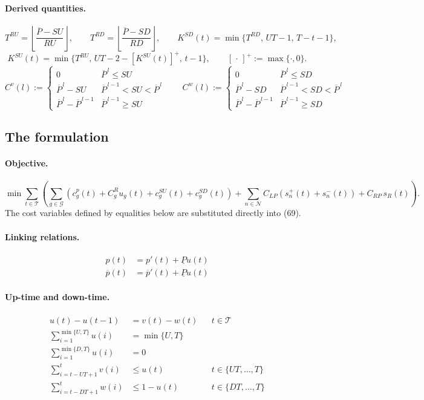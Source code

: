 \documentclass[11pt]{article}
\newcommand{\Pmax}{\overline{P}}
\newcommand{\Pmin}{\underline{P}}
\newcommand{\pbar}{\overline{p}}
\begin{document}
\paragraph{Derived quantities.}
\[
T^{RU} = \left\lfloor \frac{\Pmax - SU}{RU} \right\rfloor, \qquad
T^{RD} = \left\lfloor \frac{\Pmax - SD}{RD} \right\rfloor, \qquad
K^{SD}(t) = \min\{T^{RD},\, UT-1,\, T-t-1\},
\]
\[
K^{SU}(t) = \min\{T^{RU},\, UT-2-[K^{SU}(t)]^+,\, t-1\}, \qquad [\,\cdot\,]^+ := \max\{\cdot,0\}.
\]
\[
C^v(l) := \begin{cases}
0 & \Pmax^{\,l} \le SU \\
\Pmax^{\,l} - SU & \Pmax^{\,l-1} < SU < \Pmax^{\,l} \\
\Pmax^{\,l} - \Pmax^{\,l-1} & \Pmax^{\,l-1} \ge SU
\end{cases}
\qquad
C^w(l) := \begin{cases}
0 & \Pmax^{\,l} \le SD \\
\Pmax^{\,l} - SD & \Pmax^{\,l-1} < SD < \Pmax^{\,l} \\
\Pmax^{\,l} - \Pmax^{\,l-1} & \Pmax^{\,l-1} \ge SD
\end{cases}
\]

\subsection{The formulation}
\label{app:equations}

\paragraph{Objective.}
\begin{equation}
\min \sum_{t \in \mathcal{T}} \left( \sum_{g \in \mathcal{G}} \left( c^p_g(t) + C^R_g u_g(t) + c^{SU}_g(t) + c^{SD}_g(t) \right) + \sum_{n \in \mathcal{N}} C_{LP} \left( s_n^+(t) + s_n^-(t) \right) + C_{RP}\, s_R(t) \right). \tag{69}
\end{equation}
The cost variables defined by equalities below are substituted directly into (69).

\paragraph{Linking relations.}
\begin{align}
p(t) &= p'(t) + \Pmin u(t) \tag{12}\label{eq:12} \\
\pbar(t) &= \pbar'(t) + \Pmin u(t) \tag{13}\label{eq:13}
\end{align}

\paragraph{Up-time and down-time.}
\begin{align}
u(t) - u(t-1) &= v(t) - w(t) && t \in \mathcal{T} \tag{2} \\
\sum_{i=1}^{\min\{U,T\}} u(i) &= \min\{U,T\} \tag{3a} \\
\sum_{i=1}^{\min\{D,T\}} u(i) &= 0 \tag{3b} \\
\sum_{i=t-UT+1}^{t} v(i) &\le u(t) && t \in \{UT,\dots,T\} \tag{4} \\
\sum_{i=t-DT+1}^{t} w(i) &\le 1-u(t) && t \in \{DT,\dots,T\} \tag{5}
\end{align}
\end{document}

